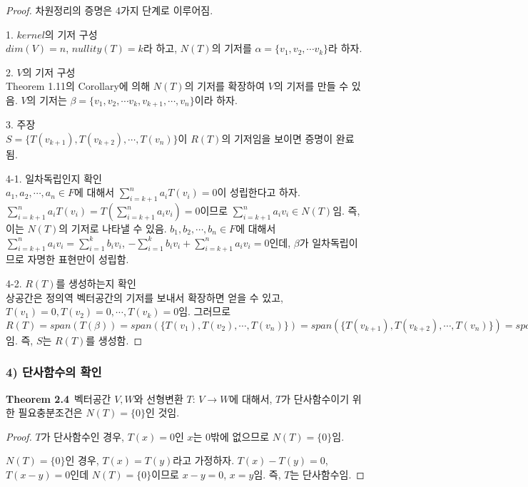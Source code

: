 \begin{proof}
차원정리의 증명은 4가지 단계로 이루어짐.

1. $kernel$의 기저 구성\\
$dim(V)=n$, $nullity(T)=k$라 하고, $N(T)$의 기저를 $\alpha = \{ v_1,v_2, \cdots v_k \}$라 하자.

2. $V$의 기저 구성\\
Theorem 1.11의 Corollary에 의해 $N(T)$의 기저를 확장하여 $V$의 기저를 만들 수 있음. $V$의 기저는 $\beta = \{ v_1,v_2, \cdots v_k,v_{k+1}, \cdots ,v_n \}$이라 하자.

3. 주장\\
$S=\{ T(v_{k+1}),T(v_{k+2}), \cdots ,T(v_n) \}$이 $R(T)$의 기저임을 보이면 증명이 완료됨.

4-1. 일차독립인지 확인\\
$a_1,a_2, \cdots ,a_n \in F$에 대해서 $\sum_{i=k+1}^{n}{a_{i}T(v_{i})}=0$이 성립한다고 하자. $\sum_{i=k+1}^{n}{a_{i}T(v_{i})}=T(\sum_{i=k+1}^{n}{a_{i}v_{i}})=0$이므로 $\sum_{i=k+1}^{n}{a_{i}v_{i}} \in N(T)$임. 즉, 이는 $N(T)$의 기저로 나타낼 수 있음. $b_1,b_2, \cdots ,b_n \in F$에 대해서 $\sum_{i=k+1}^{n}{a_{i}v_{i}}=\sum_{i=1}^{k}{b_{i}v_{i}}$, $-\sum_{i=1}^{k}{b_{i}v_{i}} + \sum_{i=k+1}^{n}{a_{i}v_{i}}=0$인데, $\beta$가 일차독립이므로 자명한 표현만이 성립함.

4-2. $R(T)$를 생성하는지 확인\\
상공간은 정의역 벡터공간의 기저를 보내서 확장하면 얻을 수 있고, $T(v_{1})=0,T(v_{2})=0, \cdots ,T(v_k)=0$임. 그러므로 $R(T)=span(T(\beta))=span(\{ T(v_{1}),T(v_{2}), \cdots ,T(v_n) \})=span(\{ T(v_{k+1}),T(v_{k+2}), \cdots ,T(v_n) \})=span(S)$임. 즉, $S$는 $R(T)$를 생성함.
\end{proof}

\subsubsection*{4) 단사함수의 확인}
\textbf{Theorem 2.4}\, 벡터공간 $V,W$와 선형변환 $T:\,V \rightarrow W$에 대해서, $T$가 단사함수이기 위한 필요충분조건은 $N(T)=\{0\}$인 것임.

\begin{proof}
$T$가 단사함수인 경우, $T(x)=0$인 $x$는 0밖에 없으므로 $N(T)=\{0\}$임.

$N(T)=\{0\}$인 경우, $T(x)=T(y)$라고 가정하자. $T(x)-T(y)=0$, $T(x-y)=0$인데 $N(T)=\{0\}$이므로 $x-y=0$, $x=y$임. 즉, $T$는 단사함수임.
\end{proof}


\newpage


